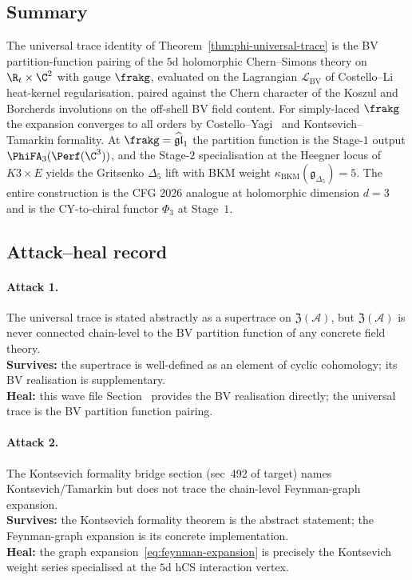 \subsection*{Summary}

The universal trace identity of
Theorem~\ref{thm:phi-universal-trace} is the BV partition-function
pairing of the $5$d holomorphic Chern--Simons theory on
$\R_t\times\C^2$ with gauge $\frakg$, evaluated on the Lagrangian
$\mathcal{L}_{\mathrm{BV}}$ of Costello--Li heat-kernel regularisation,
paired against the Chern character of the Koszul and Borcherds
involutions on the off-shell BV field content. For simply-laced
$\frakg$ the expansion converges to all orders by
Costello--Yagi~\cite{CostelloYagi2018} and Kontsevich--Tamarkin
formality. At $\frakg = \widehat{\mathfrak{gl}}_1$ the partition
function is the Stage-$1$ output $\PhiFA_3(\Perf(\C^3))$, and the
Stage-$2$ specialisation at the Heegner locus of $K3\times E$ yields
the Gritsenko $\Delta_5$ lift with BKM weight
$\kappa_{\mathrm{BKM}}(\mathfrak{g}_{\Delta_5}) = 5$. The entire
construction is the CFG 2026 analogue at holomorphic dimension $d = 3$
and is the CY-to-chiral functor $\Phi_3$ at Stage~$1$.

\subsection*{Attack--heal record}

\paragraph{Attack 1.}
The universal trace is stated abstractly as a supertrace on
$\mathfrak{Z}(\mathcal{A})$, but $\mathfrak{Z}(\mathcal{A})$ is never
connected chain-level to the BV partition function of any concrete
field theory. \\
\textbf{Survives:} the supertrace is well-defined as an element of
cyclic cohomology; its BV realisation is supplementary. \\
\textbf{Heal:} this wave file Section~ provides the BV realisation
directly; the universal trace is the BV partition function pairing.

\paragraph{Attack 2.}
The Kontsevich formality bridge section (sec~492 of target) names
Kontsevich/Tamarkin but does not trace the chain-level Feynman-graph
expansion. \\
\textbf{Survives:} the Kontsevich formality theorem is the abstract
statement; the Feynman-graph expansion is its concrete implementation. \\
\textbf{Heal:} the graph expansion~\eqref{eq:feynman-expansion} is
precisely the Kontsevich weight series specialised at the $5$d hCS
interaction vertex.

